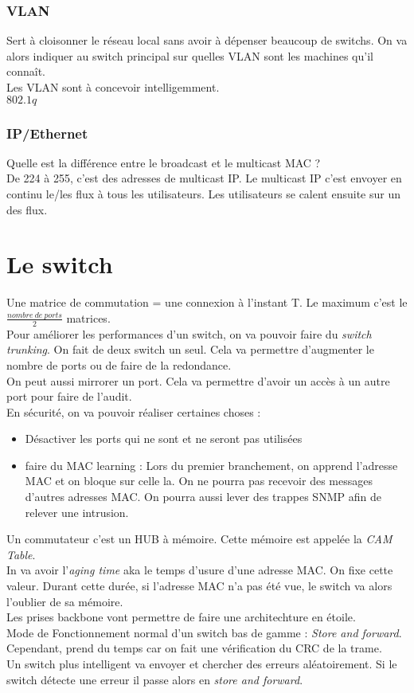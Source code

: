 \subsubsection{VLAN}
Sert à cloisonner le réseau local sans avoir à dépenser beaucoup de switchs. On va alors indiquer au switch principal sur quelles VLAN sont les machines qu'il connaît.\\
Les VLAN sont à concevoir intelligemment.\\
$802.1q$ 
\subsubsection{IP/Ethernet}
Quelle est la différence entre le broadcast et le multicast MAC ?\\
De 224 à 255, c'est des adresses de multicast IP. Le multicast IP c'est envoyer en continu le/les flux à tous les utilisateurs. Les utilisateurs se calent ensuite sur un des flux.
\section{Le switch}
Une matrice de commutation = une connexion à l'instant T. Le maximum c'est le $\frac{nombre~de~ports}{2}$ matrices.\\
Pour améliorer les performances d'un switch, on va pouvoir faire du \textit{switch trunking}. On fait de deux switch un seul. Cela va permettre d'augmenter le nombre de ports ou de faire de la redondance.\\
On peut aussi mirrorer un port. Cela va permettre d'avoir un accès à un autre port pour faire de l'audit.\\
En sécurité, on va pouvoir réaliser certaines choses :
\begin{itemize}
 \item Désactiver les ports qui ne sont et ne seront pas utilisées
 \item faire du MAC learning : Lors du premier branchement, on apprend l'adresse MAC et on bloque sur celle la. On ne pourra pas recevoir des messages d'autres adresses MAC. On pourra aussi lever des trappes SNMP afin de relever une intrusion.
\end{itemize}
Un commutateur c'est un HUB à mémoire. Cette mémoire est appelée la \textit{CAM Table}.\\
In va avoir l'\textit{aging time} aka le temps d'usure d'une adresse MAC. On fixe cette valeur. Durant cette durée, si l'adresse MAC n'a pas été vue, le switch va alors l'oublier de sa mémoire.\\
Les prises backbone vont permettre de faire une architechture en étoile.\\
Mode de Fonctionnement normal d'un switch bas de gamme : \textit{Store and forward}. Cependant, prend du temps car on fait une vérification du CRC de la trame.\\
Un switch plus intelligent va envoyer et chercher des erreurs aléatoirement. Si le switch détecte une erreur il passe alors en \textit{store and forward}.
